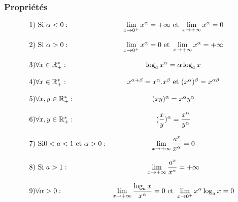 \documentclass[oneside,11pt,french,table]{book}
\theoremstyle{definition}
\theoremstyle{plain}
\theoremstyle{remark}
\begin{document}
 \subsubsection{Propriétés}
 \begin{equation*}
     \begin{array}{l c}
          1) \text{ Si } \alpha<0: &  \lim\limits_{x\to 0^+}{x^{\alpha}}=+\infty \text{ et }  \lim\limits_{x\to +\infty}{x^{\alpha}}=0 \\ 
          \\
          2) \text{ Si } \alpha>0: &  \lim\limits_{x\to 0^+}{x^{\alpha}}=0 \text{ et }  \lim\limits_{x\to +\infty}{x^{\alpha}}=+\infty\\ \\
          3) \forall x\in \mathbb{R}_+^*:& \log_a{x^{\alpha}}=\alpha\log_a{x} \\
          \\
          4) \forall x\in \mathbb{R}_+^*: & x^{\alpha+\beta}=x^{\alpha}.x^{\beta} \text{ et } (x^{\alpha})^{\beta}=x^{\alpha\beta}\\ 
          \\ 
          5) \forall x,y\in \mathbb{R}_+^*: & (xy)^{\alpha}=x^{\alpha}y^{\alpha} \\ 
          \\ 
          6) \forall x,y\in \mathbb{R}_+^*: & (\displaystyle\frac{x}{y})^{\alpha}=\displaystyle\frac{x^{\alpha}}{y^{\alpha}} \\ 
          \\
          7) \text{ Si} 0<a<1 \text{ et } \alpha>0 :& \lim\limits_{x\to + \infty}{\displaystyle\frac{a^x}{x^{\alpha}}}=0 \\ 
          \\
          8) \text{ Si } a>1 :& \lim\limits_{x\to + \infty}{\displaystyle\frac{a^x}{x^{\alpha}}}=+\infty \\ 
          \\
          9) \forall \alpha >0 : & \lim\limits_{x\to +\infty}{\displaystyle\frac{\log_a{x}}{x^{\alpha}}}=0 \text{ et } \lim\limits_{x \to 0^+}{ x^{\alpha}\log_a{x}}=0
     \end{array}
 \end{equation*}
\end{document}
